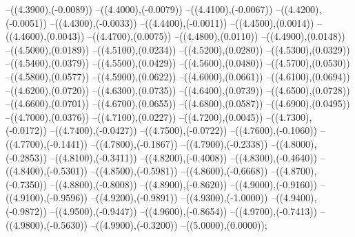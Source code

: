 {	--({\sx*(4.3900)},{\sy*(-0.0089)})
	--({\sx*(4.4000)},{\sy*(-0.0079)})
	--({\sx*(4.4100)},{\sy*(-0.0067)})
	--({\sx*(4.4200)},{\sy*(-0.0051)})
	--({\sx*(4.4300)},{\sy*(-0.0033)})
	--({\sx*(4.4400)},{\sy*(-0.0011)})
	--({\sx*(4.4500)},{\sy*(0.0014)})
	--({\sx*(4.4600)},{\sy*(0.0043)})
	--({\sx*(4.4700)},{\sy*(0.0075)})
	--({\sx*(4.4800)},{\sy*(0.0110)})
	--({\sx*(4.4900)},{\sy*(0.0148)})
	--({\sx*(4.5000)},{\sy*(0.0189)})
	--({\sx*(4.5100)},{\sy*(0.0234)})
	--({\sx*(4.5200)},{\sy*(0.0280)})
	--({\sx*(4.5300)},{\sy*(0.0329)})
	--({\sx*(4.5400)},{\sy*(0.0379)})
	--({\sx*(4.5500)},{\sy*(0.0429)})
	--({\sx*(4.5600)},{\sy*(0.0480)})
	--({\sx*(4.5700)},{\sy*(0.0530)})
	--({\sx*(4.5800)},{\sy*(0.0577)})
	--({\sx*(4.5900)},{\sy*(0.0622)})
	--({\sx*(4.6000)},{\sy*(0.0661)})
	--({\sx*(4.6100)},{\sy*(0.0694)})
	--({\sx*(4.6200)},{\sy*(0.0720)})
	--({\sx*(4.6300)},{\sy*(0.0735)})
	--({\sx*(4.6400)},{\sy*(0.0739)})
	--({\sx*(4.6500)},{\sy*(0.0728)})
	--({\sx*(4.6600)},{\sy*(0.0701)})
	--({\sx*(4.6700)},{\sy*(0.0655)})
	--({\sx*(4.6800)},{\sy*(0.0587)})
	--({\sx*(4.6900)},{\sy*(0.0495)})
	--({\sx*(4.7000)},{\sy*(0.0376)})
	--({\sx*(4.7100)},{\sy*(0.0227)})
	--({\sx*(4.7200)},{\sy*(0.0045)})
	--({\sx*(4.7300)},{\sy*(-0.0172)})
	--({\sx*(4.7400)},{\sy*(-0.0427)})
	--({\sx*(4.7500)},{\sy*(-0.0722)})
	--({\sx*(4.7600)},{\sy*(-0.1060)})
	--({\sx*(4.7700)},{\sy*(-0.1441)})
	--({\sx*(4.7800)},{\sy*(-0.1867)})
	--({\sx*(4.7900)},{\sy*(-0.2338)})
	--({\sx*(4.8000)},{\sy*(-0.2853)})
	--({\sx*(4.8100)},{\sy*(-0.3411)})
	--({\sx*(4.8200)},{\sy*(-0.4008)})
	--({\sx*(4.8300)},{\sy*(-0.4640)})
	--({\sx*(4.8400)},{\sy*(-0.5301)})
	--({\sx*(4.8500)},{\sy*(-0.5981)})
	--({\sx*(4.8600)},{\sy*(-0.6668)})
	--({\sx*(4.8700)},{\sy*(-0.7350)})
	--({\sx*(4.8800)},{\sy*(-0.8008)})
	--({\sx*(4.8900)},{\sy*(-0.8620)})
	--({\sx*(4.9000)},{\sy*(-0.9160)})
	--({\sx*(4.9100)},{\sy*(-0.9596)})
	--({\sx*(4.9200)},{\sy*(-0.9891)})
	--({\sx*(4.9300)},{\sy*(-1.0000)})
	--({\sx*(4.9400)},{\sy*(-0.9872)})
	--({\sx*(4.9500)},{\sy*(-0.9447)})
	--({\sx*(4.9600)},{\sy*(-0.8654)})
	--({\sx*(4.9700)},{\sy*(-0.7413)})
	--({\sx*(4.9800)},{\sy*(-0.5630)})
	--({\sx*(4.9900)},{\sy*(-0.3200)})
	--({\sx*(5.0000)},{\sy*(0.0000)});
}
